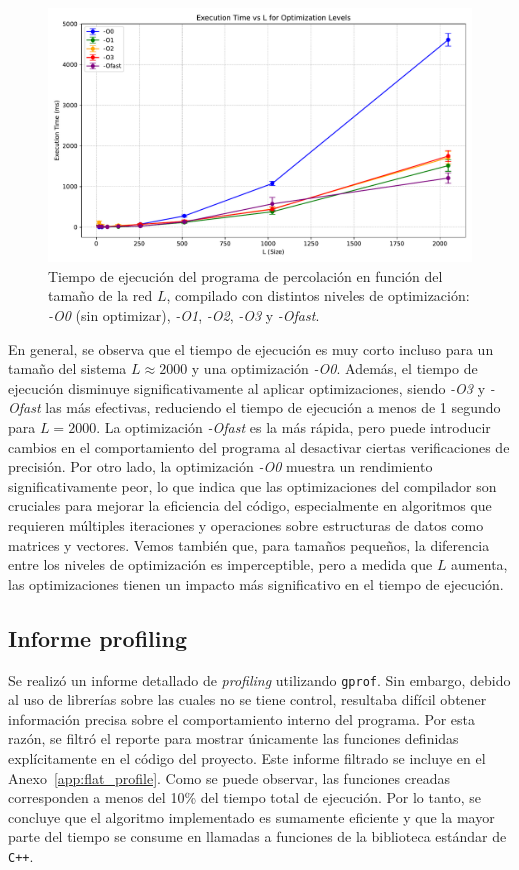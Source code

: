 \documentclass{article}
\begin{document}
\begin{figure}[h!]
    \centering
    \includegraphics[width=1.0\textwidth]{figures/opti_comparison.pdf}
    \caption{Tiempo de ejecución del programa de percolación en función del tamaño de la red \(L\), compilado con distintos niveles de optimización: \textit{-O0} (sin optimizar), \textit{-O1}, \textit{-O2}, \textit{-O3} y \textit{-Ofast}.}
    \label{fig:opt_levels}
\end{figure}

En general, se observa que el tiempo de ejecución es muy corto incluso para un tamaño del sistema \(L \approx 2000\) y una optimización \textit{-O0}. Además, el tiempo de ejecución disminuye significativamente al aplicar optimizaciones, siendo \textit{-O3} y \textit{-Ofast} las más efectivas, reduciendo el tiempo de ejecución a menos de 1 segundo para \(L = 2000\). La optimización \textit{-Ofast} es la más rápida, pero puede introducir cambios en el comportamiento del programa al desactivar ciertas verificaciones de precisión. Por otro lado, la optimización \textit{-O0} muestra un rendimiento significativamente peor, lo que indica que las optimizaciones del compilador son cruciales para mejorar la eficiencia del código, especialmente en algoritmos que requieren múltiples iteraciones y operaciones sobre estructuras de datos como matrices y vectores. Vemos también que, para tamaños pequeños, la diferencia entre los niveles de optimización es imperceptible, pero a medida que \(L\) aumenta, las optimizaciones tienen un impacto más significativo en el tiempo de ejecución.

\subsection{Informe profiling}
Se realizó un informe detallado de \textit{profiling} utilizando \texttt{gprof}. Sin embargo, debido al uso de librerías sobre las cuales no se tiene control, resultaba difícil obtener información precisa sobre el comportamiento interno del programa. Por esta razón, se filtró el reporte para mostrar únicamente las funciones definidas explícitamente en el código del proyecto. Este informe filtrado se incluye en el Anexo~\ref{app:flat_profile}. Como se puede observar, las funciones creadas corresponden a menos del 10\% del tiempo total de ejecución. Por lo tanto, se concluye que el algoritmo implementado es sumamente eficiente y que la mayor parte del tiempo se consume en llamadas a funciones de la biblioteca estándar de \texttt{C++}.
\end{document}
